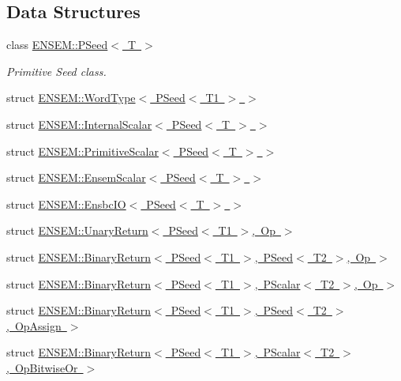 \subsection*{Data Structures}
\begin{DoxyCompactItemize}
\item 
class \mbox{\hyperlink{classENSEM_1_1PSeed}{E\+N\+S\+E\+M\+::\+P\+Seed$<$ T $>$}}
\begin{DoxyCompactList}\small\item\em Primitive Seed class. \end{DoxyCompactList}\item 
struct \mbox{\hyperlink{structENSEM_1_1WordType_3_01PSeed_3_01T1_01_4_01_4}{E\+N\+S\+E\+M\+::\+Word\+Type$<$ P\+Seed$<$ T1 $>$ $>$}}
\item 
struct \mbox{\hyperlink{structENSEM_1_1InternalScalar_3_01PSeed_3_01T_01_4_01_4}{E\+N\+S\+E\+M\+::\+Internal\+Scalar$<$ P\+Seed$<$ T $>$ $>$}}
\item 
struct \mbox{\hyperlink{structENSEM_1_1PrimitiveScalar_3_01PSeed_3_01T_01_4_01_4}{E\+N\+S\+E\+M\+::\+Primitive\+Scalar$<$ P\+Seed$<$ T $>$ $>$}}
\item 
struct \mbox{\hyperlink{structENSEM_1_1EnsemScalar_3_01PSeed_3_01T_01_4_01_4}{E\+N\+S\+E\+M\+::\+Ensem\+Scalar$<$ P\+Seed$<$ T $>$ $>$}}
\item 
struct \mbox{\hyperlink{structENSEM_1_1EnsbcIO_3_01PSeed_3_01T_01_4_01_4}{E\+N\+S\+E\+M\+::\+Ensbc\+I\+O$<$ P\+Seed$<$ T $>$ $>$}}
\item 
struct \mbox{\hyperlink{structENSEM_1_1UnaryReturn_3_01PSeed_3_01T1_01_4_00_01Op_01_4}{E\+N\+S\+E\+M\+::\+Unary\+Return$<$ P\+Seed$<$ T1 $>$, Op $>$}}
\item 
struct \mbox{\hyperlink{structENSEM_1_1BinaryReturn_3_01PSeed_3_01T1_01_4_00_01PSeed_3_01T2_01_4_00_01Op_01_4}{E\+N\+S\+E\+M\+::\+Binary\+Return$<$ P\+Seed$<$ T1 $>$, P\+Seed$<$ T2 $>$, Op $>$}}
\item 
struct \mbox{\hyperlink{structENSEM_1_1BinaryReturn_3_01PSeed_3_01T1_01_4_00_01PScalar_3_01T2_01_4_00_01Op_01_4}{E\+N\+S\+E\+M\+::\+Binary\+Return$<$ P\+Seed$<$ T1 $>$, P\+Scalar$<$ T2 $>$, Op $>$}}
\item 
struct \mbox{\hyperlink{structENSEM_1_1BinaryReturn_3_01PSeed_3_01T1_01_4_00_01PSeed_3_01T2_01_4_00_01OpAssign_01_4}{E\+N\+S\+E\+M\+::\+Binary\+Return$<$ P\+Seed$<$ T1 $>$, P\+Seed$<$ T2 $>$, Op\+Assign $>$}}
\item 
struct \mbox{\hyperlink{structENSEM_1_1BinaryReturn_3_01PSeed_3_01T1_01_4_00_01PScalar_3_01T2_01_4_00_01OpBitwiseOr_01_4}{E\+N\+S\+E\+M\+::\+Binary\+Return$<$ P\+Seed$<$ T1 $>$, P\+Scalar$<$ T2 $>$, Op\+Bitwise\+Or $>$}}

\end{DoxyCompactItemize}
